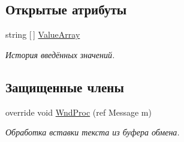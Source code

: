 \subsection*{Открытые атрибуты}
\begin{DoxyCompactItemize}
\item 
string \mbox{[}$\,$\mbox{]} \mbox{\hyperlink{class_f_b_a_1_1_text_box_f_b_a_a2ff2dbdef4e57edea77d5b23aa04396e}{Value\+Array}}
\begin{DoxyCompactList}\small\item\em История введённых значений. \end{DoxyCompactList}\end{DoxyCompactItemize}
\subsection*{Защищенные члены}
\begin{DoxyCompactItemize}
\item 
override void \mbox{\hyperlink{class_f_b_a_1_1_text_box_f_b_a_a91aa4fe71cce340d5d9cc886b1090f90}{Wnd\+Proc}} (ref Message m)
\begin{DoxyCompactList}\small\item\em Обработка вставки текста из буфера обмена. \end{DoxyCompactList}\end{DoxyCompactItemize}
